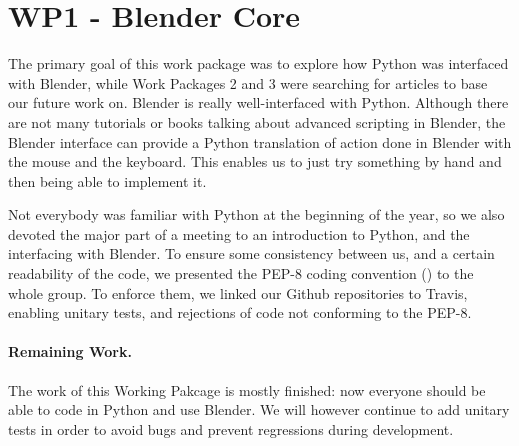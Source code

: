 \section{WP1 - Blender Core}

The primary goal of this work package was to explore how Python was interfaced with Blender, while Work Packages 2 and 3 were searching for articles to base our future work on. Blender is really well-interfaced with Python. Although there are not many tutorials or books talking about advanced scripting in Blender, the Blender interface can provide a Python translation of action done in Blender with the mouse and the keyboard. This enables us to just try something by hand and then being able to implement it. 
\par Not everybody was familiar with Python at the beginning of the year, so we also devoted the major part of a meeting to an introduction to Python, and the interfacing with Blender. To ensure some consistency between us, and a certain readability of the code, we presented the PEP-8 coding convention (\cite{pep8}) to the whole group. To enforce them, we linked our Github repositories to Travis, enabling unitary tests, and rejections of code not conforming to the PEP-8.
\paragraph{Remaining Work.} The work of this Working Pakcage is mostly finished: now everyone should be able to code in Python and use Blender. We will however continue to add unitary tests in order to avoid bugs and prevent regressions during development. 

